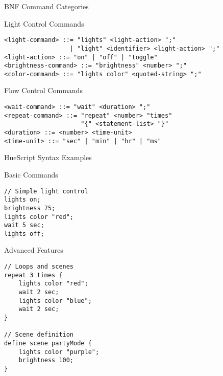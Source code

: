 \documentclass{beamer}
\begin{document}
\begin{frame}{BNF Command Categories}
\begin{block}{Light Control Commands}
\begin{lstlisting}[basicstyle=\tiny]
<light-command> ::= "lights" <light-action> ";"
                  | "light" <identifier> <light-action> ";"
<light-action> ::= "on" | "off" | "toggle"
<brightness-command> ::= "brightness" <number> ";"
<color-command> ::= "lights color" <quoted-string> ";"
\end{lstlisting}
\end{block}

\begin{block}{Flow Control Commands}
\begin{lstlisting}[basicstyle=\tiny]
<wait-command> ::= "wait" <duration> ";"
<repeat-command> ::= "repeat" <number> "times" 
                     "{" <statement-list> "}"
<duration> ::= <number> <time-unit>
<time-unit> ::= "sec" | "min" | "hr" | "ms"
\end{lstlisting}
\end{block}
\end{frame}

\begin{frame}{HueScript Syntax Examples}
\begin{block}{Basic Commands}
\begin{lstlisting}[basicstyle=\footnotesize]
// Simple light control
lights on;
brightness 75;
lights color "red";
wait 5 sec;
lights off;
\end{lstlisting}
\end{block}

\begin{block}{Advanced Features}
\begin{lstlisting}[basicstyle=\footnotesize]
// Loops and scenes
repeat 3 times {
    lights color "red";
    wait 2 sec;
    lights color "blue";
    wait 2 sec;
}

// Scene definition
define scene partyMode {
    lights color "purple";
    brightness 100;
}
\end{lstlisting}
\end{block}
\end{frame}
\end{document}

